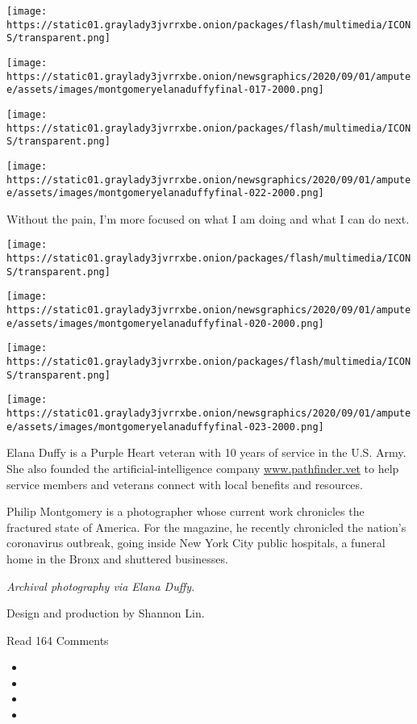 \texttt{[image: https://static01.graylady3jvrrxbe.onion/packages/flash/multimedia/ICONS/transparent.png]}

\texttt{[image: https://static01.graylady3jvrrxbe.onion/newsgraphics/2020/09/01/amputee/assets/images/montgomeryelanaduffyfinal-017-2000.png]}

\texttt{[image: https://static01.graylady3jvrrxbe.onion/packages/flash/multimedia/ICONS/transparent.png]}

\texttt{[image: https://static01.graylady3jvrrxbe.onion/newsgraphics/2020/09/01/amputee/assets/images/montgomeryelanaduffyfinal-022-2000.png]}

Without the pain, I'm more focused on what I am doing and what I can do
next.

\texttt{[image: https://static01.graylady3jvrrxbe.onion/packages/flash/multimedia/ICONS/transparent.png]}

\texttt{[image: https://static01.graylady3jvrrxbe.onion/newsgraphics/2020/09/01/amputee/assets/images/montgomeryelanaduffyfinal-020-2000.png]}

\texttt{[image: https://static01.graylady3jvrrxbe.onion/packages/flash/multimedia/ICONS/transparent.png]}

\texttt{[image: https://static01.graylady3jvrrxbe.onion/newsgraphics/2020/09/01/amputee/assets/images/montgomeryelanaduffyfinal-023-2000.png]}

Elana Duffy is a Purple Heart veteran with 10 years of service in the
U.S. Army. She also founded the artificial-intelligence company
\href{http://www.pathfinder.vet}{www.pathfinder.vet} to help service
members and veterans connect with local benefits and resources.

Philip Montgomery is a photographer whose current work chronicles the
fractured state of America. For the magazine, he recently chronicled the
nation's coronavirus outbreak, going inside New York City public
hospitals, a funeral home in the Bronx and shuttered businesses.

\emph{Archival photography via Elana Duffy.}

Design and production by Shannon Lin.

Read 164 Comments

\begin{itemize}
\item
\item
\item
\item
\end{itemize}

